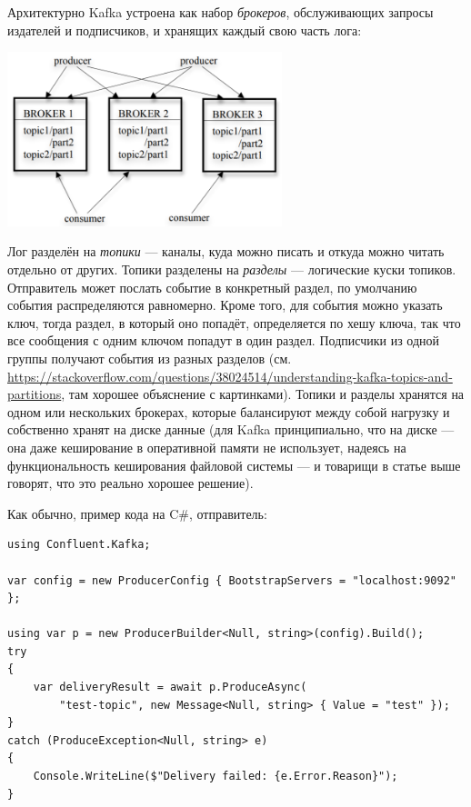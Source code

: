 \documentclass{../../text-style}
\begin{document}
Архитектурно Kafka устроена как набор \emph{брокеров}, обслуживающих запросы издателей и подписчиков, и хранящих каждый свою часть лога:

\begin{center}
    \includegraphics[width=0.6\textwidth]{kafkaArchitecture.png}
\end{center}

Лог разделён на \emph{топики} --- каналы, куда можно писать и откуда можно читать отдельно от других. Топики разделены на \emph{разделы} --- логические куски топиков. Отправитель может послать событие в конкретный раздел, по умолчанию события распределяются равномерно. Кроме того, для события можно указать ключ, тогда раздел, в который оно попадёт, определяется по хешу ключа, так что все сообщения с одним ключом попадут в один раздел. Подписчики из одной группы получают события из разных разделов (см. \url{https://stackoverflow.com/questions/38024514/understanding-kafka-topics-and-partitions}, там хорошее объяснение с картинками). Топики и разделы хранятся на одном или нескольких брокерах, которые балансируют между собой нагрузку и собственно хранят на диске данные (для Kafka принципиально, что на диске --- она даже кеширование в оперативной памяти не использует, надеясь на функциональность кеширования файловой системы --- и товарищи в статье выше говорят, что это реально хорошее решение).

Как обычно, пример кода на C\#, отправитель:

\begin{verbatim}
using Confluent.Kafka;

var config = new ProducerConfig { BootstrapServers = "localhost:9092" };

using var p = new ProducerBuilder<Null, string>(config).Build();
try
{
    var deliveryResult = await p.ProduceAsync(
        "test-topic", new Message<Null, string> { Value = "test" });
}
catch (ProduceException<Null, string> e)
{
    Console.WriteLine($"Delivery failed: {e.Error.Reason}");
}
\end{verbatim}
\end{document}
